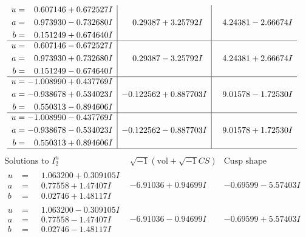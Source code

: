 \documentclass[1p]{elsarticle_modified}
\theoremstyle{definition}
\newcommand{\I}{\sqrt{-1}}
\begin{document}
$$\begin{array}{c|c|c}
\begin{aligned}
u &= \phantom{-}0.607146 + 0.672527 I \\
a &= \phantom{-}0.973930 - 0.732680 I \\
b &= \phantom{-}0.151249 + 0.674640 I\end{aligned}
 & \phantom{-}0.29387 + 3.25792 I & \phantom{-}4.24381 - 2.66674 I \\ \hline\begin{aligned}
u &= \phantom{-}0.607146 - 0.672527 I \\
a &= \phantom{-}0.973930 + 0.732680 I \\
b &= \phantom{-}0.151249 - 0.674640 I\end{aligned}
 & \phantom{-}0.29387 - 3.25792 I & \phantom{-}4.24381 + 2.66674 I \\ \hline\begin{aligned}
u &= -1.008990 + 0.437769 I \\
a &= -0.938678 + 0.534023 I \\
b &= \phantom{-}0.550313 - 0.894606 I\end{aligned}
 & -0.122562 + 0.887703 I & \phantom{-}9.01578 - 1.72530 I \\ \hline\begin{aligned}
u &= -1.008990 - 0.437769 I \\
a &= -0.938678 - 0.534023 I \\
b &= \phantom{-}0.550313 + 0.894606 I\end{aligned}
 & -0.122562 - 0.887703 I & \phantom{-}9.01578 + 1.72530 I\\
 \hline 
 \end{array}$$\newpage$$\begin{array}{c|c|c}  
\text{Solutions to }I^u_{2}& \I (\text{vol} + \sqrt{-1}CS) & \text{Cusp shape}\\
 \hline 
\begin{aligned}
u &= \phantom{-}1.063200 + 0.309105 I \\
a &= \phantom{-}0.77558 + 1.47407 I \\
b &= \phantom{-}0.02746 + 1.48117 I\end{aligned}
 & -6.91036 + 0.94699 I & -0.69599 - 5.57403 I \\ \hline\begin{aligned}
u &= \phantom{-}1.063200 - 0.309105 I \\
a &= \phantom{-}0.77558 - 1.47407 I \\
b &= \phantom{-}0.02746 - 1.48117 I\end{aligned}
 & -6.91036 - 0.94699 I & -0.69599 + 5.57403 I \\ \hline\begin{aligned}

\end{aligned}
\end{array}$$
\end{document}
